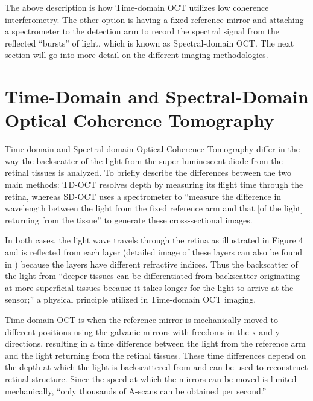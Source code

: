 
The above description is how Time-domain OCT utilizes low coherence interferometry.  The other option is having a fixed reference mirror and attaching a spectrometer to the detection arm to record the spectral signal from the reflected “bursts” of light, which is known as Spectral-domain OCT. \cite{}  The next section will go into more detail on the different imaging methodologies. 

\section{Time-Domain and Spectral-Domain Optical Coherence Tomography}
Time-domain and Spectral-domain Optical Coherence Tomography differ in the way the backscatter of the light from the super-luminescent diode from the retinal tissues is analyzed.  To briefly describe the differences between the two main methods: TD-OCT resolves depth by measuring its flight time through the retina, whereas SD-OCT uses a spectrometer to “measure the difference in wavelength between the light from the fixed reference arm and that [of the light] returning from the tissue” \cite{}  to generate these cross-sectional images.  

In both cases, the light wave travels through the retina as illustrated in Figure 4 and is reflected from each layer (detailed image of these layers can also be found in  ) because the layers have different refractive indices.  Thus the backscatter of the light from “deeper tissues can be differentiated from backscatter originating at more superficial tissues because it takes longer for the light to arrive at the sensor;” \cite{} a physical principle utilized in Time-domain OCT imaging.

Time-domain OCT is when the reference mirror is mechanically moved to different positions using the galvanic mirrors with freedoms in the x and y directions, resulting in a time difference between the light from the reference arm and the light returning from the retinal tissues.  These time differences depend on the depth at which the light is backscattered from and can be used to reconstruct retinal structure.  Since the speed at which the mirrors can be moved is limited mechanically, “only thousands of A-scans can be obtained per second.” \cite{}

